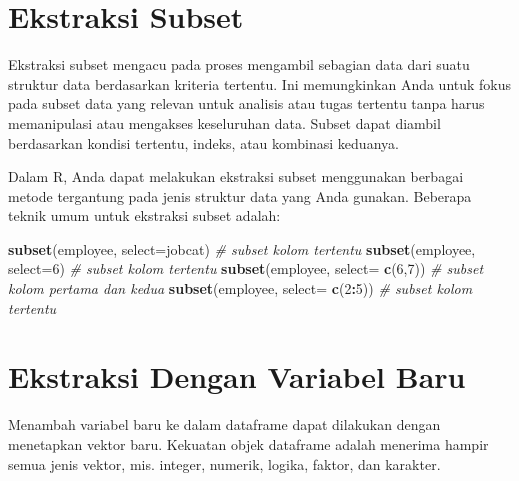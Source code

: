 \documentclass[
]{book}
\newenvironment{Shaded}{\begin{snugshade}}{\end{snugshade}}
\newcommand{\AttributeTok}[1]{\textcolor[rgb]{0.13,0.29,0.53}{#1}}
\newcommand{\CommentTok}[1]{\textcolor[rgb]{0.56,0.35,0.01}{\textit{#1}}}
\newcommand{\DecValTok}[1]{\textcolor[rgb]{0.00,0.00,0.81}{#1}}
\newcommand{\FunctionTok}[1]{\textcolor[rgb]{0.13,0.29,0.53}{\textbf{#1}}}
\newcommand{\NormalTok}[1]{#1}
\newcommand{\SpecialCharTok}[1]{\textcolor[rgb]{0.81,0.36,0.00}{\textbf{#1}}}
\newcommand{\StringTok}[1]{\textcolor[rgb]{0.31,0.60,0.02}{#1}}
\begin{document}
\hypertarget{ekstraksi-subset}{%
\section{Ekstraksi Subset}\label{ekstraksi-subset}}

Ekstraksi subset mengacu pada proses mengambil sebagian data dari suatu struktur data berdasarkan kriteria tertentu. Ini memungkinkan Anda untuk fokus pada subset data yang relevan untuk analisis atau tugas tertentu tanpa harus memanipulasi atau mengakses keseluruhan data. Subset dapat diambil berdasarkan kondisi tertentu, indeks, atau kombinasi keduanya.

Dalam R, Anda dapat melakukan ekstraksi subset menggunakan berbagai metode tergantung pada jenis struktur data yang Anda gunakan. Beberapa teknik umum untuk ekstraksi subset adalah:

\begin{Shaded}
\begin{Highlighting}[]
\FunctionTok{subset}\NormalTok{(employee, }\AttributeTok{select=}\StringTok{\textquotesingle{}jobcat\textquotesingle{}}\NormalTok{)    }\CommentTok{\# subset kolom tertentu}
\FunctionTok{subset}\NormalTok{(employee, }\AttributeTok{select=}\DecValTok{6}\NormalTok{)           }\CommentTok{\# subset kolom tertentu }
\FunctionTok{subset}\NormalTok{(employee, }\AttributeTok{select=} \FunctionTok{c}\NormalTok{(}\DecValTok{6}\NormalTok{,}\DecValTok{7}\NormalTok{))     }\CommentTok{\# subset kolom pertama dan kedua}
\FunctionTok{subset}\NormalTok{(employee, }\AttributeTok{select=} \FunctionTok{c}\NormalTok{(}\DecValTok{2}\SpecialCharTok{:}\DecValTok{5}\NormalTok{))     }\CommentTok{\# subset kolom tertentu}
\end{Highlighting}
\end{Shaded}

\hypertarget{ekstraksi-dengan-variabel-baru}{%
\section{Ekstraksi Dengan Variabel Baru}\label{ekstraksi-dengan-variabel-baru}}

Menambah variabel baru ke dalam dataframe dapat dilakukan dengan menetapkan vektor baru. Kekuatan objek dataframe adalah menerima hampir semua jenis vektor, mis. integer, numerik, logika, faktor, dan karakter.
\end{document}
